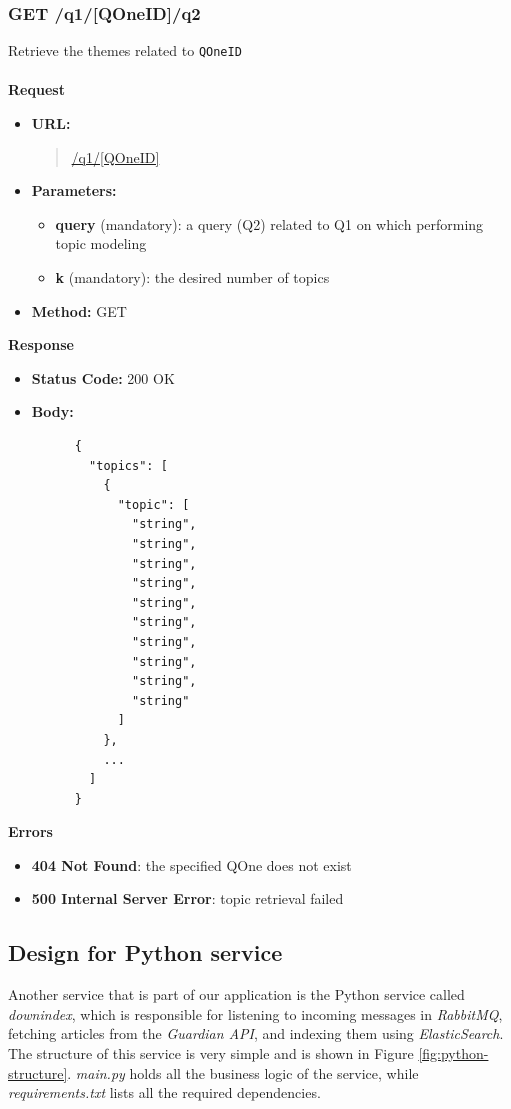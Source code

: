 \subsubsection{GET /q1/[QOneID]/q2}
Retrieve the themes related to \verb|QOneID| \\\\
\textbf{Request}
\begin{itemize}
  \item \textbf{URL:}
  \begin{quote}
    \url{/q1/[QOneID]}
  \end{quote}
  \item \textbf{Parameters:}
    \begin{itemize}
      \item \textbf{query} (mandatory): a query (Q2) related to Q1 on which performing topic modeling
      \item \textbf{k} (mandatory): the desired number of topics
    \end{itemize}
  \item \textbf{Method:} GET
\end{itemize}\leavevmode\newline
\textbf{Response}
\begin{itemize}
  \item \textbf{Status Code:} 200 OK
  \item \textbf{Body:}
    \begin{lstlisting}
      {
        "topics": [
          {
            "topic": [
              "string",
              "string",
              "string",
              "string",
              "string",
              "string",
              "string",
              "string",
              "string",
              "string"
            ]
          },
          ...
        ]
      }
    \end{lstlisting}
\end{itemize}\leavevmode\newline
\textbf{Errors}
\begin{itemize}
  \item \textbf{404 Not Found}: the specified QOne does not exist
  \item \textbf{500 Internal Server Error}: topic retrieval failed
\end{itemize}

\subsection{Design for Python service}
Another service that is part of our application is the Python service called \textit{downindex}, which is responsible for listening to incoming messages in \textit{RabbitMQ}, fetching articles from the \textit{Guardian API}, and indexing them using \textit{ElasticSearch}. The structure of this service is very simple and is shown in Figure \ref{fig:python-structure}. \textit{main.py} holds all the business logic of the service, while \textit{requirements.txt} lists all the required dependencies.

